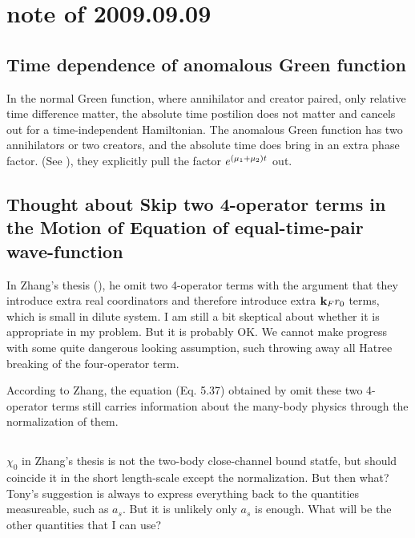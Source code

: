 \section{note of 2009.09.09}
\subsection{Time dependence of anomalous Green function}
In the normal Green function, where annihilator and creator paired, only relative time difference matter, the absolute time postilion does not matter and cancels out for a time-independent Hamiltonian.  The anomalous Green function has two annihilators or two creators, and the absolute time does bring in an extra phase factor.  (See \cite{Abrikosov}), they explicitly pull the factor $e^{\left(\mu_1+\mu_2\right)t}$ out.  

\subsection{Thought about Skip two 4-operator terms in the Motion of Equation of equal-time-pair wave-function }

In Zhang's thesis (\cite{ZhangThesis}), he omit two 4-operator terms with the argument that they introduce extra real coordinators and therefore introduce extra $\mathbf{k}_F{}r_0$ terms, which is small in dilute system.  I am still a bit skeptical about whether it is appropriate in my problem. But it is probably OK.  We cannot make progress with some quite dangerous looking assumption, such throwing away all Hatree breaking of the four-operator term.

According to Zhang, the equation (Eq. 5.37) obtained by omit these two 4-operator terms still carries information about the many-body physics through the normalization of them.    


\subsection{}
$\chi_0$ in Zhang's thesis is not the two-body close-channel bound statfe, but should coincide it in the short length-scale except the normalization.  But then what?  Tony's suggestion is always to express everything back to the quantities measureable, such as $a_s$.  But it is unlikely only $a_s$ is enough.  What will be the other quantities that I can use?  

